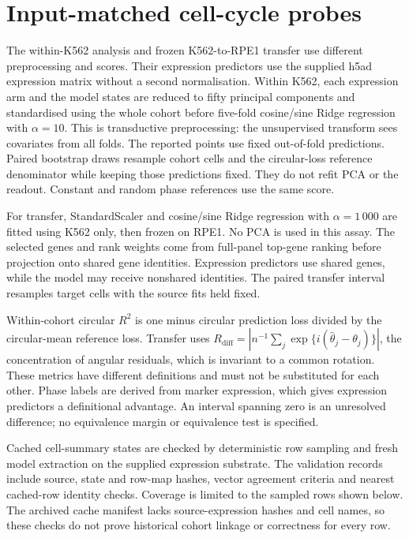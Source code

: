 \documentclass[11pt]{article}
\begin{document}


\section{Input-matched cell-cycle probes}

The within-K562 analysis and frozen K562-to-RPE1 transfer use different preprocessing and scores.
Their expression predictors use the supplied h5ad expression matrix without a second normalisation.
Within K562, each expression arm and the model states are reduced to fifty principal components
and standardised using the whole cohort before five-fold cosine/sine Ridge regression with
$\alpha=10$. This is transductive preprocessing: the unsupervised transform sees covariates from
all folds. The reported points use fixed out-of-fold predictions. Paired bootstrap draws resample
cohort cells and the circular-loss reference denominator while keeping those predictions fixed.
They do not refit PCA or the readout. Constant and random phase references use the same score.

For transfer, StandardScaler and cosine/sine Ridge regression with $\alpha=1\,000$ are fitted
using K562 only, then frozen on RPE1. No PCA is used in this assay. The selected genes and rank
weights come from full-panel top-gene ranking before projection onto shared gene identities.
Expression predictors use shared genes, while the model may receive nonshared identities.
The paired transfer interval resamples target cells with the source fits held fixed.

Within-cohort circular $R^2$ is one minus circular prediction loss divided by the circular-mean
reference loss. Transfer uses
$R_{\mathrm{diff}}=|n^{-1}\sum_j \exp\{i(\widehat\theta_j-\theta_j)\}|$,
the concentration of angular residuals, which is invariant to a common rotation. These metrics
have different definitions and must not be substituted for each other. Phase labels are derived
from marker expression, which gives expression predictors a definitional advantage. An interval
spanning zero is an unresolved difference; no equivalence margin or equivalence test is specified.



Cached cell-summary states are checked by deterministic row sampling and fresh model extraction
on the supplied expression substrate. The validation records include source, state and row-map
hashes, vector agreement criteria and nearest cached-row identity checks. Coverage is limited to
the sampled rows shown below. The archived cache manifest lacks source-expression hashes and
cell names, so these checks do not prove historical cohort linkage or correctness for every row.
\end{document}
